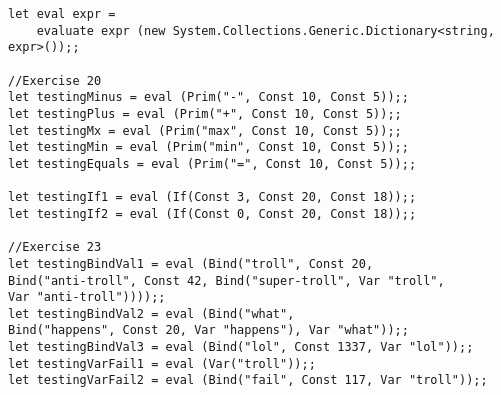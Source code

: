 \begin{lstlisting}
let eval expr =
    evaluate expr (new System.Collections.Generic.Dictionary<string, expr>());;

//Exercise 20
let testingMinus = eval (Prim("-", Const 10, Const 5));;
let testingPlus = eval (Prim("+", Const 10, Const 5));;
let testingMx = eval (Prim("max", Const 10, Const 5));;
let testingMin = eval (Prim("min", Const 10, Const 5));;
let testingEquals = eval (Prim("=", Const 10, Const 5));;

let testingIf1 = eval (If(Const 3, Const 20, Const 18));;
let testingIf2 = eval (If(Const 0, Const 20, Const 18));;

//Exercise 23
let testingBindVal1 = eval (Bind("troll", Const 20, 
Bind("anti-troll", Const 42, Bind("super-troll", Var "troll", 
Var "anti-troll"))));;
let testingBindVal2 = eval (Bind("what", 
Bind("happens", Const 20, Var "happens"), Var "what"));;
let testingBindVal3 = eval (Bind("lol", Const 1337, Var "lol"));;
let testingVarFail1 = eval (Var("troll"));;
let testingVarFail2 = eval (Bind("fail", Const 117, Var "troll"));;
\end{lstlisting}

